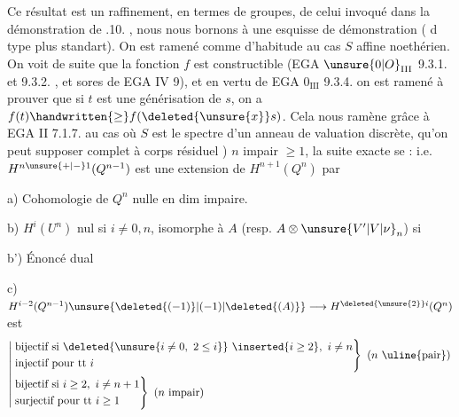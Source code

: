 Ce résultat est un raffinement, en termes de groupes, de celui invoqué dans la démonstration de  .10. , nous nous bornons à une esquisse de  démonstration ( d type  plus standart). On est ramené comme d'habitude au cas $S$ affine noethérien. On voit de suite que la fonction $f$ est constructible (EGA  $\unsure{0|O}_{\mathrm{III}}$ 9.3.1. et 9.3.2. , et sores de EGA IV 9), et en vertu de EGA $0_{\mathrm{III}}$ 9.3.4. on est ramené  à prouver que si $t$ est une générisation de $s$, on a $f(t)\handwritten{\geq}f(\deleted{\unsure{x}}s)$. Cela nous ramène  grâce à EGA II 7.1.7. au cas où $S$ est le spectre d'un anneau de valuation discrète, qu'on peut supposer complet à corps résiduel
) $n$ impair $\geq1$, la suite exacte se  :
i.e. $H^{n\unsure{+|-}1}(Q^{n-1})$ est une extension de $H^{n+1}(Q^n)$ par

a) Cohomologie de $Q^n$ nulle en dim impaire.

b) $H^i(U^n)$ nul si $i\ne0,n$, isomorphe à $A$ (resp. $A\otimes \unsure{V'|V|\nu}_n$) si 

b') Énoncé dual

c) $H^{i-2}(Q^{n-1})\unsure{\deleted{(-1)}|(-1)|\deleted{(A)}}\longrightarrow H^{\deleted{\unsure{2}}i}(Q^n)$ est
\[
\left|\begin{aligned}
&\left.\begin{aligned}
&\text{bijectif si }\deleted{\unsure{i\ne0,\ 2\leq i}}\ \inserted{i\geq2},\ i\ne n\\
&\text{injectif pour tt }i
\end{aligned}\right\}\ (n\ \text{\uline{pair}})\\
&\left.\begin{aligned}
&\text{bijectif si }i\geq2,\ i\ne n+1\\
&\text{surjectif pour tt }i\geq1
\end{aligned}\right\}\ (n\text{ impair})
\end{aligned}\right.
\]

